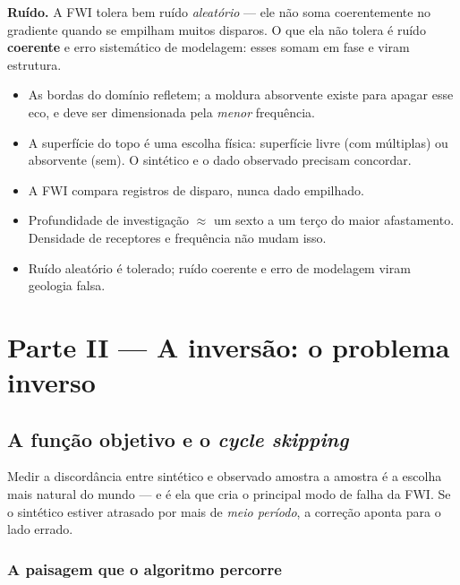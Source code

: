 \documentclass[11pt,a4paper,oneside]{report}
\begin{document}
\textbf{Ru\'ido.} A FWI tolera bem ru\'ido \emph{aleat\'orio} --- ele n\~ao
soma coerentemente no gradiente quando se empilham muitos disparos. O que ela
n\~ao tolera \'e ru\'ido \textbf{coerente} e erro sistem\'atico de modelagem:
esses somam em fase e viram estrutura.

\begin{resumo}
\begin{itemize}[leftmargin=*, itemsep=1pt]
\item As bordas do dom\'inio refletem; a moldura absorvente existe para
apagar esse eco, e deve ser dimensionada pela \emph{menor} frequ\^encia.
\item A superf\'icie do topo \'e uma escolha f\'isica: superf\'icie livre
(com m\'ultiplas) ou absorvente (sem). O sint\'etico e o dado observado
precisam concordar.
\item A FWI compara registros de disparo, nunca dado empilhado.
\item Profundidade de investiga\c{c}\~ao $\approx$ um sexto a um ter\c{c}o do
maior afastamento. Densidade de receptores e frequ\^encia n\~ao mudam isso.
\item Ru\'ido aleat\'orio \'e tolerado; ru\'ido coerente e erro de modelagem
viram geologia falsa.
\end{itemize}
\end{resumo}

\part*{\centering\color{azulfwi} Parte II --- A invers\~ao: o problema inverso}

\chapter{A fun\c{c}\~ao objetivo e o \emph{cycle skipping}}
\label{cap:misfit}

\begin{ideia}
Medir a discord\^ancia entre sint\'etico e observado amostra a amostra \'e a
escolha mais natural do mundo --- e \'e ela que cria o principal modo de
falha da FWI. Se o sint\'etico estiver atrasado por mais de \emph{meio
per\'iodo}, a corre\c{c}\~ao aponta para o lado errado.
\end{ideia}

\section{A paisagem que o algoritmo percorre}
\end{document}
